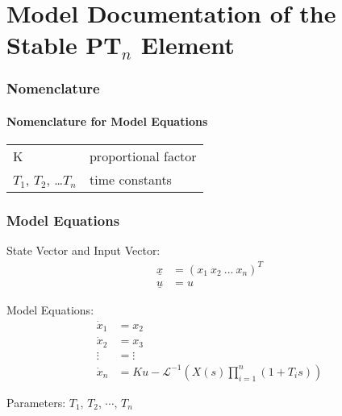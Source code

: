 \documentclass[10pt,a4paper]{article}
\begin{document}
	\part*{Model Documentation of the \\ Stable PT$_n$ Element} %
	
	
	\section{Nomenclature} %
	\subsection{Nomenclature for Model Equations} %
	
	\begin{tabular}{ll}
		K & proportional factor \\
		$T_1$, $T_2$, \dots $T_n$ & time constants
	\end{tabular}
	
	
	
	\section{Model Equations} %
	
	State Vector and Input Vector:
	\begin{align*}
		\underline{x} &= (x_1 \ x_2 \ ... \ x_n)^T \\
		\underline{u} &= u
	\end{align*}

	\noindent Model Equations:		
	\begin{subequations}
	\begin{align}
		\dot{x}_1 &= x_2 \\    
		\dot{x}_2 &= x_3 \\
		\vdots &= \vdots \\
		\dot{x}_n &= Ku - \mathscr{L}^{-1}(X(s) \prod_{i = 1}^{n}(1 + T_i s))
	\end{align}
	\end{subequations}

	
	\noindent
	Parameters: $T_1, \, T_2, \, \cdots, \, T_n$ %
	
\end{document}
